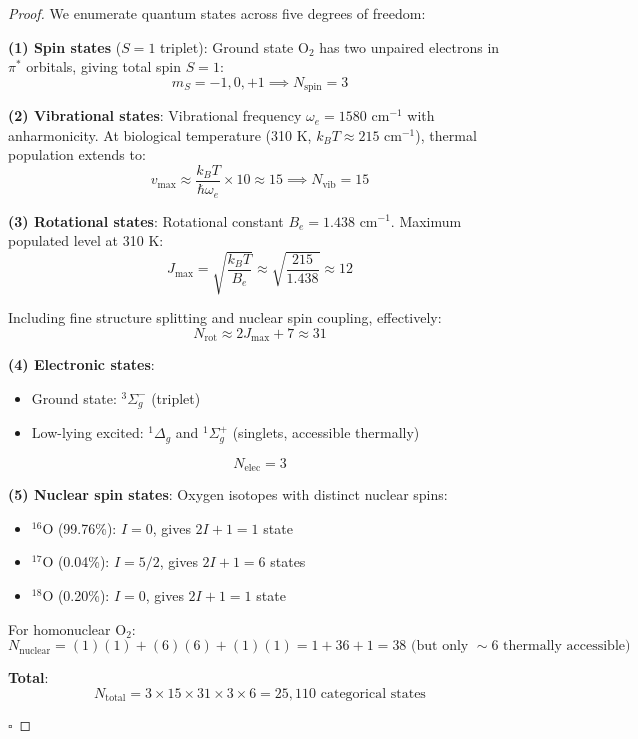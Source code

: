 \begin{proof}
We enumerate quantum states across five degrees of freedom:

\textbf{(1) Spin states} ($S = 1$ triplet):
Ground state O\(_2\) has two unpaired electrons in $\pi^*$ orbitals, giving total spin $S = 1$:
\begin{equation}
m_S = -1, 0, +1 \implies N_{\text{spin}} = 3
\end{equation}

\textbf{(2) Vibrational states}:
Vibrational frequency $\omega_e = 1580$ cm\(^{-1}\) with anharmonicity. At biological temperature (310 K, $k_B T \approx 215$ cm\(^{-1}\)), thermal population extends to:
\begin{equation}
v_{\max} \approx \frac{k_B T}{\hbar \omega_e} \times 10 \approx 15 \implies N_{\text{vib}} = 15
\end{equation}

\textbf{(3) Rotational states}:
Rotational constant $B_e = 1.438$ cm\(^{-1}\). Maximum populated level at 310 K:
\begin{equation}
J_{\max} = \sqrt{\frac{k_B T}{B_e}} \approx \sqrt{\frac{215}{1.438}} \approx 12
\end{equation}

Including fine structure splitting and nuclear spin coupling, effectively:
\begin{equation}
N_{\text{rot}} \approx 2J_{\max} + 7 \approx 31
\end{equation}

\textbf{(4) Electronic states}:
\begin{itemize}
\item Ground state: \(^3\Sigma_g^-\) (triplet)
\item Low-lying excited: \(^1\Delta_g\) and \(^1\Sigma_g^+\) (singlets, accessible thermally)
\end{itemize}
\begin{equation}
N_{\text{elec}} = 3
\end{equation}

\textbf{(5) Nuclear spin states}:
Oxygen isotopes with distinct nuclear spins:
\begin{itemize}
\item \(^{16}\)O (99.76\%): $I = 0$, gives $2I+1 = 1$ state
\item \(^{17}\)O (0.04\%): $I = 5/2$, gives $2I+1 = 6$ states
\item \(^{18}\)O (0.20\%): $I = 0$, gives $2I+1 = 1$ state
\end{itemize}

For homonuclear O\(_2\):
\begin{equation}
N_{\text{nuclear}} = (1)(1) + (6)(6) + (1)(1) = 1 + 36 + 1 = 38 \text{ (but only } \sim 6 \text{ thermally accessible)}
\end{equation}

\textbf{Total}:
\begin{equation}
N_{\text{total}} = 3 \times 15 \times 31 \times 3 \times 6 = 25{,}110 \text{ categorical states}
\end{equation}

$\square$
\end{proof}

